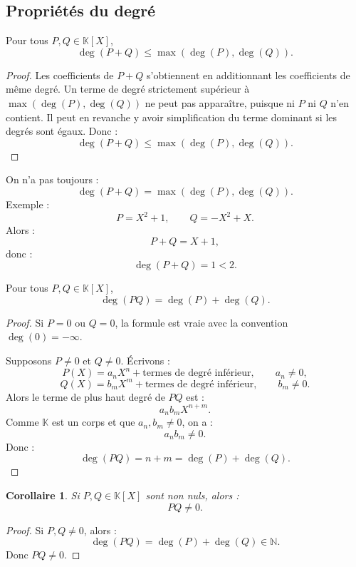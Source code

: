 \documentclass[11pt,a4paper]{article}
\newcommand{\K}{\mathbb K}
\newcommand{\N}{\mathbb N}
\newtheorem{corollaire}[prop]{Corollaire}
\begin{document}
\subsection{Propriétés du degré}

\begin{theorembox}
Pour tous \(P,Q\in\K[X]\),
\[
\deg(P+Q)\leq \max(\deg(P),\deg(Q)).
\]
\end{theorembox}

\begin{proof}
Les coefficients de \(P+Q\) s'obtiennent en additionnant les coefficients de même degré.  
Un terme de degré strictement supérieur à \(\max(\deg(P),\deg(Q))\) ne peut pas apparaître, puisque ni \(P\) ni \(Q\) n'en contient.  
Il peut en revanche y avoir simplification du terme dominant si les degrés sont égaux.  
Donc :
\[
\deg(P+Q)\leq \max(\deg(P),\deg(Q)).
\]
\end{proof}

\begin{erreurbox}
On n'a pas toujours :
\[
\deg(P+Q)=\max(\deg(P),\deg(Q)).
\]
Exemple :
\[
P=X^2+1,\qquad Q=-X^2+X.
\]
Alors :
\[
P+Q=X+1,
\]
donc :
\[
\deg(P+Q)=1<2.
\]
\end{erreurbox}

\begin{theorembox}
Pour tous \(P,Q\in\K[X]\),
\[
\deg(PQ)=\deg(P)+\deg(Q).
\]
\end{theorembox}

\begin{proof}
Si \(P=0\) ou \(Q=0\), la formule est vraie avec la convention \(\deg(0)=-\infty\).

Supposons \(P\neq0\) et \(Q\neq0\).  
Écrivons :
\[
P(X)=a_nX^n+\text{termes de degré inférieur},
\qquad a_n\neq0,
\]
\[
Q(X)=b_mX^m+\text{termes de degré inférieur},
\qquad b_m\neq0.
\]
Alors le terme de plus haut degré de \(PQ\) est :
\[
a_nb_mX^{n+m}.
\]
Comme \(\K\) est un corps et que \(a_n,b_m\neq0\), on a :
\[
a_nb_m\neq0.
\]
Donc :
\[
\deg(PQ)=n+m=\deg(P)+\deg(Q).
\]
\end{proof}

\begin{corollaire}
Si \(P,Q\in\K[X]\) sont non nuls, alors :
\[
PQ\neq0.
\]
\end{corollaire}

\begin{proof}
Si \(P,Q\neq0\), alors :
\[
\deg(PQ)=\deg(P)+\deg(Q)\in\N.
\]
Donc \(PQ\neq0\).
\end{proof}
\end{document}
